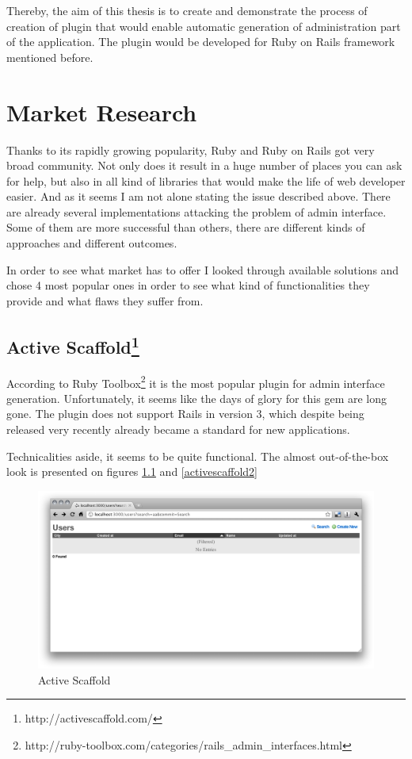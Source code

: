   Thereby, the aim of this thesis is to create and demonstrate the process of creation of plugin that would enable automatic generation of administration part of the application. The plugin would be developed for Ruby on Rails framework mentioned before.
  
\chapter{Market Research}
  Thanks to its rapidly growing popularity, Ruby and Ruby on Rails got very broad community. Not only does it result in a huge number of places you can ask for help, but also in all kind of libraries that would make the life of web developer easier. And as it seems I am not alone stating the issue described above. There are already several implementations attacking the problem of admin interface. Some of them are more successful than others, there are different kinds of approaches and different outcomes. 
  
  In order to see what market has to offer I looked through available solutions and chose 4 most popular ones in order to see what kind of functionalities they provide and what flaws they suffer from. 
  
    \section[Active Scaffold] {Active Scaffold\footnote{http://activescaffold.com/}}
      According to Ruby Toolbox\footnote{http://ruby-toolbox.com/categories/rails\_admin\_interfaces.html} it is the most popular plugin for admin interface generation. Unfortunately, it seems like the days of glory for this gem are long gone. The plugin does not support Rails in version 3, which despite being released very recently already became a standard for new applications. 
      
      Technicalities aside, it seems to be quite functional. The almost out-of-the-box look is presented on figures \ref{activescaffold1} and \ref{activescaffold2}
      \begin{figure}[hbt!]
    		\begin{center}
    			\includegraphics[width=\linewidth]{images/chapter01/activescaffold1.png}
    			\caption{Active Scaffold}
    			\label{activescaffold1}
    		\end{center}
    	\end{figure}
    	
